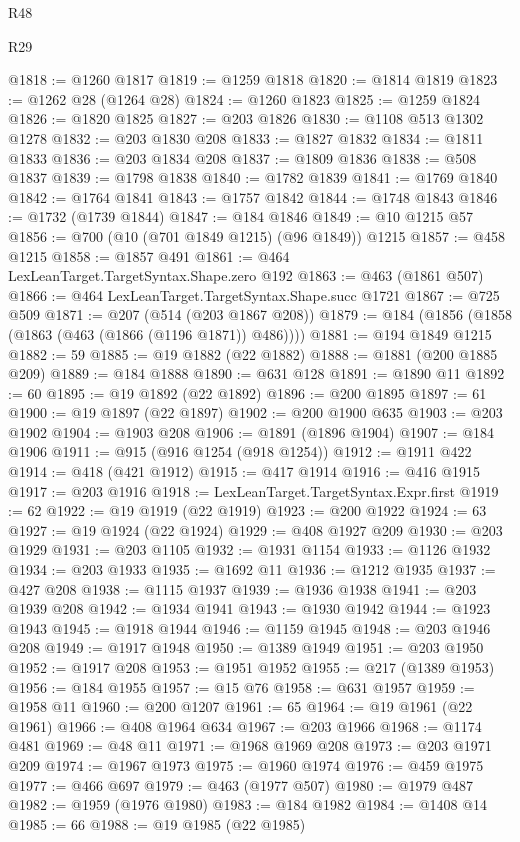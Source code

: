 \begin{lexlean}{R48}
\begin{lexlean}{R29}
\begin{coremodule}
{{{{{{{{{{{{{{{{{{{{{{{{{{{{{{{{{{{{{{{{{{{{{{{{{{{{{{{{{{{{{{{{{{{{{{{{{{{{{{{{{{{{{{{{{{{{{{{{{{{{{{{{{{{{{{{{{{{{{{{{{{{{{{{{{{{{{{{{{{{{{{{{{{{{{{{{{{{{{{{{{{{{{{{{{{{{{{{{{{{{{{{{{{{{{{{{{{{{{{{{{{{{{{{{{{{{{{{{{{@1818 := @1260 @1817
@1819 := @1259 @1818
@1820 := @1814 @1819
@1823 := @1262 @28 (@1264 @28)
@1824 := @1260 @1823
@1825 := @1259 @1824
@1826 := @1820 @1825
@1827 := @203 @1826
@1830 := @1108 @513 @1302 @1278
@1832 := @203 @1830 @208
@1833 := @1827 @1832
@1834 := @1811 @1833
@1836 := @203 @1834 @208
@1837 := @1809 @1836
@1838 := @508 @1837
@1839 := @1798 @1838
@1840 := @1782 @1839
@1841 := @1769 @1840
@1842 := @1764 @1841
@1843 := @1757 @1842
@1844 := @1748 @1843
@1846 := @1732 (@1739 @1844)
@1847 := @184 @1846
@1849 := @10 @1215 @57
@1856 := @700 (@10 (@701 @1849 @1215) (@96 @1849)) @1215
@1857 := @458 @1215
@1858 := @1857 @491
@1861 := @464 LexLeanTarget.TargetSyntax.Shape.zero @192
@1863 := @463 (@1861 @507)
@1866 := @464 LexLeanTarget.TargetSyntax.Shape.succ @1721
@1867 := @725 @509
@1871 := @207 (@514 (@203 @1867 @208))
@1879 := @184 (@1856 (@1858 (@1863 (@463 (@1866 (@1196 @1871)) @486))))
@1881 := @194 @1849 @1215
@1882 := 59
@1885 := @19 @1882 (@22 @1882)
@1888 := @1881 (@200 @1885 @209)
@1889 := @184 @1888
@1890 := @631 @128
@1891 := @1890 @11
@1892 := 60
@1895 := @19 @1892 (@22 @1892)
@1896 := @200 @1895
@1897 := 61
@1900 := @19 @1897 (@22 @1897)
@1902 := @200 @1900 @635
@1903 := @203 @1902
@1904 := @1903 @208
@1906 := @1891 (@1896 @1904)
@1907 := @184 @1906
@1911 := @915 (@916 @1254 (@918 @1254))
@1912 := @1911 @422
@1914 := @418 (@421 @1912)
@1915 := @417 @1914
@1916 := @416 @1915
@1917 := @203 @1916
@1918 := LexLeanTarget.TargetSyntax.Expr.first
@1919 := 62
@1922 := @19 @1919 (@22 @1919)
@1923 := @200 @1922
@1924 := 63
@1927 := @19 @1924 (@22 @1924)
@1929 := @408 @1927 @209
@1930 := @203 @1929
@1931 := @203 @1105
@1932 := @1931 @1154
@1933 := @1126 @1932
@1934 := @203 @1933
@1935 := @1692 @11
@1936 := @1212 @1935
@1937 := @427 @208
@1938 := @1115 @1937
@1939 := @1936 @1938
@1941 := @203 @1939 @208
@1942 := @1934 @1941
@1943 := @1930 @1942
@1944 := @1923 @1943
@1945 := @1918 @1944
@1946 := @1159 @1945
@1948 := @203 @1946 @208
@1949 := @1917 @1948
@1950 := @1389 @1949
@1951 := @203 @1950
@1952 := @1917 @208
@1953 := @1951 @1952
@1955 := @217 (@1389 @1953)
@1956 := @184 @1955
@1957 := @15 @76
@1958 := @631 @1957
@1959 := @1958 @11
@1960 := @200 @1207
@1961 := 65
@1964 := @19 @1961 (@22 @1961)
@1966 := @408 @1964 @634
@1967 := @203 @1966
@1968 := @1174 @481
@1969 := @48 @11
@1971 := @1968 @1969 @208
@1973 := @203 @1971 @209
@1974 := @1967 @1973
@1975 := @1960 @1974
@1976 := @459 @1975
@1977 := @466 @697
@1979 := @463 (@1977 @507)
@1980 := @1979 @487
@1982 := @1959 (@1976 @1980)
@1983 := @184 @1982
@1984 := @1408 @14
@1985 := 66
@1988 := @19 @1985 (@22 @1985)
}}}}}}}}}}}}}}}}}}}}}}}}}}}}}}}}}}}}}}}}}}}}}}}}}}}}}}}}}}}}}}}}}}}}}}}}}}}}}}}}}}}}}}}}}}}}}}}}}}}}}}}}}}}}}}}}}}}}}}}}}}}}}}}}}}}}}}}}}}}}}}}}}}}}}}}}}}}}}}}}}}}}}}}}}}}}}}}}}}}}}}}}}}}}}}}}}}}}}}}}}}}}}}}}}}}}}}}}}}
\end{coremodule}
\end{lexlean}
\end{lexlean}
